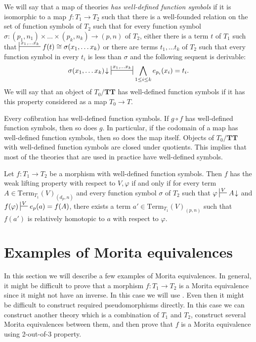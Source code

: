 \documentclass[reqno]{amsart}
\theoremstyle{definition}
\theoremstyle{remark}
\newcommand{\cat}[1]{\mathbf{#1}}
\newcommand{\algtt}{\cat{TT}}
\newcommand{\Term}{\mathrm{Term}}
\numberwithin{figure}{section}
\begin{document}
We will say that a map of theories \emph{has well-defined function symbols} if it is isomorphic to a map $f : T_1 \to T_2$
such that there is a well-founded relation on the set of function symbols of $T_2$ such that for every function symbol
$\sigma : (p_1,n_1) \times \ldots \times (p_k,n_k) \to (p,n)$ of $T_2$,
either there is a term $t$ of $T_1$ such that $\sststile{}{x_1, \ldots x_k} f(t) \cong \sigma(x_1, \ldots x_k)$ or
there are terms $t_1, \ldots t_k$ of $T_2$ such that every function symbol in every $t_i$ is less than $\sigma$ and the following sequent is derivable:
\[ \sigma(x_1, \ldots x_k)\!\downarrow\ \ssststile{}{x_1, \ldots x_k} \bigwedge_{1 \leq i \leq k} e_{p_i}(x_i) = t_i. \]
We will say that an object of $T_0/\algtt$ has well-defined function symbols if it has this property considered as a map $T_0 \to T$.

Every cofibration has well-defined function symbols.
If $g \circ f$ has well-defined function symbols, then so does $g$.
In particular, if the codomain of a map has well-defined function symbols, then so does the map itself.
Objects of $T_0/\algtt$ with well-defined function symbols are closed under quotients.
This implies that most of the theories that are used in practice have well-defined symbols.

\begin{prop}
Let $f : T_1 \to T_2$ be a morphism with well-defined function symbols.
Then $f$ has the weak lifting property with respect to $V,\varphi$ if and only if
for every term $A \in \Term_{T_1}(V)_{(d_p,n)}$ and every function symbol $\sigma$ of $T_2$ such that $\varphi \sststile{}{V} A\!\downarrow$ and $f(\varphi) \sststile{}{V} e_p(a) = f(A)$,
there exists a term $a' \in \Term_{T_1}(V)_{(p,n)}$ such that $f(a')$ is relatively homotopic to $a$ with respect to $\varphi$.
\end{prop}

\section{Examples of Morita equivalences}

In this section we will describe a few examples of Morita equivalences.
In general, it might be difficult to prove that a morphism $f : T_1 \to T_2$ is a Morita equivalence since it might not have an inverse.
In this case we will use .
Even then it might be difficult to construct required pseudomorphisms directly.
In this case we can construct another theory which is a combination of $T_1$ and $T_2$, construct several Morita equivalences between them,
and then prove that $f$ is a Morita equivalence using 2-out-of-3 property.
\end{document}
